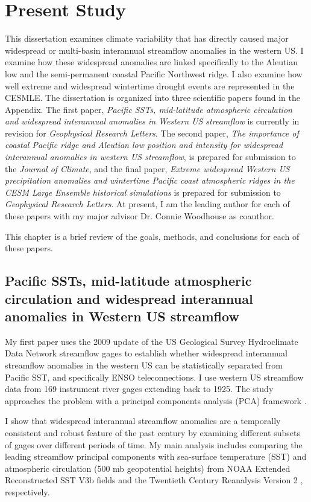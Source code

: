 \documentclass[final, double]{ua-thesis}
\begin{document}
\chapter{Present Study}

This dissertation examines climate variability that has directly caused major widespread or multi-basin interannual streamflow anomalies in the western US. I examine how these widespread anomalies are linked specifically to the Aleutian low and the semi-permanent coastal Pacific Northwest ridge. I also examine how well extreme and widespread wintertime drought events are represented in the CESMLE. The dissertation is organized into three scientific papers found in the Appendix. The first paper, \textit{Pacific SSTs, mid-latitude atmospheric circulation and widespread interannual anomalies in Western US streamflow} is currently in revision for \textit{Geophysical Research Letters}. The second paper, \textit{The importance of coastal Pacific ridge and Aleutian low position and intensity for widespread interannual anomalies in western US streamflow}, is prepared for submission to the \textit{Journal of Climate}, and the final paper, \textit{Extreme widespread Western US precipitation anomalies and wintertime Pacific coast atmospheric ridges in the CESM Large Ensemble historical simulations} is prepared for submission to \textit{Geophysical Research Letters}. At present, I am the leading author for each of these papers with my major advisor Dr. Connie Woodhouse as coauthor.

This chapter is a brief review of the goals, methods, and conclusions for each of these papers.

\section{Pacific SSTs, mid-latitude atmospheric circulation and widespread interannual anomalies in Western US streamflow}

My first paper uses the 2009 update of the US Geological Survey Hydroclimate Data Network streamflow gages \citep{lins_usgs_2012} to establish whether widespread interannual streamflow anomalies in the western US can be statistically separated from Pacific SST, and specifically ENSO teleconnections. I use western US streamflow data from 169 instrument river gages extending back to 1925. The study approaches the problem with a principal components analysis (PCA) framework \citep{wilks_statistical_2006}.

I show that widespread interannual streamflow anomalies are a temporally consistent and robust feature of the past century by examining different subsets of gages over different periods of time. My main analysis includes comparing the leading streamflow principal components with sea-surface temperature (SST) and atmospheric circulation (500 mb geopotential heights) from NOAA Extended Reconstructed SST V3b fields \citep{smith_improvements_2008} and the Twentieth Century Reanalysis Version 2 \citep{compo_twentieth_2011}, respectively.
\end{document}
